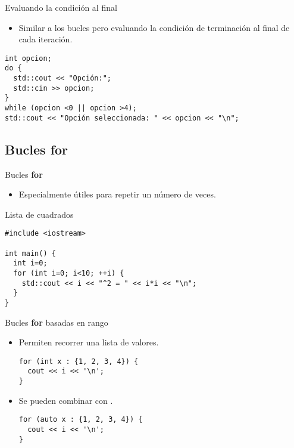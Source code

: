 \begin{frame}[t,fragile]{Evaluando la condición al final}
\begin{itemize}
  \item Similar a los bucles  pero evaluando la
        condición de terminación al final de cada iteración.
\end{itemize}
\begin{lstlisting}
int opcion;
do {
  std::cout << "Opción:";
  std::cin >> opcion;
} 
while (opcion <0 || opcion >4);
std::cout << "Opción seleccionada: " << opcion << "\n";
\end{lstlisting}
\end{frame}

\subsection{Bucles \textbf{for}}

\begin{frame}[t,fragile]{Bucles \textbf{for}}
\begin{itemize}
  \item Especialmente útiles para repetir un número de veces.
\end{itemize}
\begin{block}{Lista de cuadrados}
\begin{lstlisting}
#include <iostream>

int main() {
  int i=0;
  for (int i=0; i<10; ++i) {
    std::cout << i << "^2 = " << i*i << "\n";
  }
}
\end{lstlisting}
\end{block}
\end{frame}

\begin{frame}[t,fragile]{Bucles \textbf{for} basadas en rango}
\begin{itemize}
  \item Permiten recorrer una lista de valores.
\begin{lstlisting}
for (int x : {1, 2, 3, 4}) {
  cout << i << '\n';
}
\end{lstlisting}
  \item Se pueden combinar con .
\begin{lstlisting}
for (auto x : {1, 2, 3, 4}) {
  cout << i << '\n';
}
\end{lstlisting}

\end{itemize}
\end{frame}
